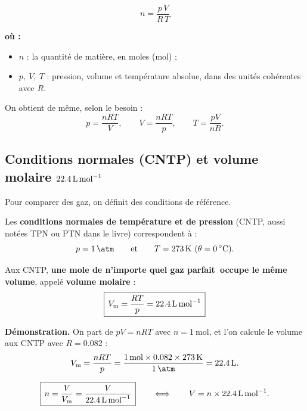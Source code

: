 \documentclass[11pt,a4paper]{article}
\newenvironment{ou}{%
  \par\smallskip\noindent\textbf{où :}\nopagebreak
  \begin{itemize}[leftmargin=1.8em,topsep=2pt,itemsep=1.5pt,parsep=0pt]}%
  {\end{itemize}}
\newcommand{\gp}{gaz parfait}
\newcommand{\Vm}{V_{\mathrm{m}}}
\begin{document}
\begin{formule}
\[ \boxed{\,n = \dfrac{p\,V}{R\,T}\,} \]
\end{formule}

\begin{ou}
  \item $n$ : la quantité de matière, en moles (\si{\mole}) ;
  \item $p,\ V,\ T$ : pression, volume et température absolue, dans des unités cohérentes avec $R$.
\end{ou}

\noindent On obtient de même, selon le besoin :
\[ p=\frac{nRT}{V},\qquad V=\frac{nRT}{p},\qquad T=\frac{pV}{nR}. \]

\subsection{Conditions normales (CNTP) et volume molaire \texorpdfstring{$\qty{22{,}4}{\litre\per\mole}$}{22,4 L/mol}}

Pour comparer des gaz, on définit des conditions de référence.

\begin{definition}
Les \textbf{conditions normales de température et de pression} (CNTP, aussi notées TPN ou PTN dans le
livre) correspondent à :
\[ p=\qty{1}{\atm}\qquad\text{et}\qquad T=\qty{273}{\kelvin}\ (\theta=\qty{0}{\degreeCelsius}). \]
\end{definition}

\begin{theoreme}
Aux CNTP, \textbf{une mole de n'importe quel \gp\ occupe le même volume}, appelé \textbf{volume
molaire} :
\[ \boxed{\,\Vm = \frac{RT}{p} = \qty{22{,}4}{\litre\per\mole}\,} \]
\end{theoreme}

\noindent \textbf{Démonstration.} On part de $pV=nRT$ avec $n=\qty{1}{\mole}$, et l'on calcule le
volume aux CNTP avec $R=\num{0,082}$ :
\[ \Vm = \frac{nRT}{p}
       = \frac{\qty{1}{\mole}\times\num{0,082}\times\qty{273}{\kelvin}}{\qty{1}{\atm}}
       = \qty{22{,}4}{\litre}. \]

\begin{formule}
\[ \boxed{\,n = \dfrac{V}{\Vm} = \dfrac{V}{\qty{22{,}4}{\litre\per\mole}}\,}
   \qquad\Longleftrightarrow\qquad
   V = n\times\qty{22{,}4}{\litre\per\mole}. \]
\end{formule}
\end{document}
